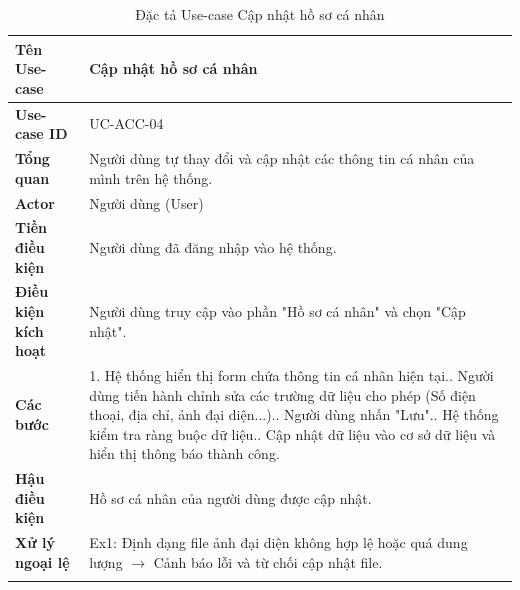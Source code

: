 \newpage
\begin{longtable}{|p{3.5cm}|p{11.5cm}|}
    \hline
    \textbf{Tên Use-case} & \textbf{Cập nhật hồ sơ cá nhân} \\
    \hline
    \textbf{Use-case ID} & UC-ACC-04 \\
    \hline
    \textbf{Tổng quan} & Người dùng tự thay đổi và cập nhật các thông tin cá nhân của mình trên hệ thống. \\
    \hline
    \textbf{Actor} & Người dùng (User) \\
    \hline
    \textbf{Tiền điều kiện} & Người dùng đã đăng nhập vào hệ thống. \\
    \hline
    \textbf{Điều kiện kích hoạt} & Người dùng truy cập vào phần "Hồ sơ cá nhân" và chọn "Cập nhật". \\
    \hline
    \textbf{Các bước} & 
    1. Hệ thống hiển thị form chứa thông tin cá nhân hiện tại.\newline
    2. Người dùng tiến hành chỉnh sửa các trường dữ liệu cho phép (Số điện thoại, địa chỉ, ảnh đại diện...).\newline
    3. Người dùng nhấn "Lưu".\newline
    4. Hệ thống kiểm tra ràng buộc dữ liệu.\newline
    5. Cập nhật dữ liệu vào cơ sở dữ liệu và hiển thị thông báo thành công. \\
    \hline
    \textbf{Hậu điều kiện} & Hồ sơ cá nhân của người dùng được cập nhật. \\
    \hline
    \textbf{Xử lý ngoại lệ} & 
    Ex1: Định dạng file ảnh đại diện không hợp lệ hoặc quá dung lượng $\rightarrow$ Cảnh báo lỗi và từ chối cập nhật file. \\
    \hline
    \caption{Đặc tả Use-case Cập nhật hồ sơ cá nhân}
\end{longtable}

